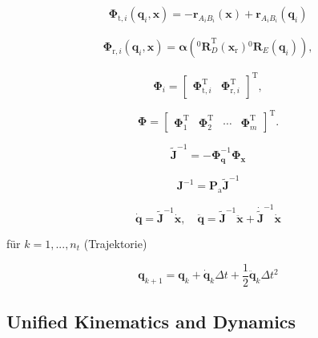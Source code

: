 \documentclass[fleqn,a4paper,10pt]{article}
\newcommand{\bm}[1]{\mathbf{#1}}
\renewcommand{\Phi}[1]{\varPhi{#1}}
\newcommand{\rotmat}[2]{{{ }^{#1}\bm{R}}_{#2}}
\newcommand{\transp}[0]{{\mathrm{T}}}
\begin{document}
\begin{multicols}{2}
%
\begin{equation}
\bm{\Phi}_{\mathrm{t},i}(\bm{q}_i,\bm{x}) = - \bm{r}_{A_iB_i}(\bm{x}) + \bm{r}_{A_iB_i}(\bm{q}_i)
\label{equ:kinconstrAB}
\end{equation}
%

\begin{align}
\bm{\Phi}_{\mathrm{r},i}(\bm{q}_i,\bm{x})
=
\bm{\alpha}\left(\rotmat{0}{D}^\transp (\bm{x}_{\mathrm{r}})\rotmat{0}{E}(\bm{q}_i)\right),
\label{equ:Phir_def_i}
\end{align}

\begin{equation}
\bm{\Phi}_i=\begin{bmatrix}
\bm{\Phi}_{\mathrm{t},i}^\transp & \bm{\Phi}_{\mathrm{r},i}^\transp
\end{bmatrix}^\transp,
\label{equ:Phi_def}
\end{equation}

\begin{equation}
\bm{\Phi}
=
\begin{bmatrix}
\bm{\Phi}_1^\transp &
\bm{\Phi}_2^\transp &
\cdots &
\bm{\Phi}_m^\transp
\end{bmatrix}^\transp.
\label{equ:constr_Phi_PKM}
\end{equation}

%

\begin{equation}
\tilde{\bm{J}}^{-1}=-\bm{\Phi}_{\bm{q}}^{-1} \bm{\Phi}_{\bm{x}}
\end{equation}

\begin{equation}
\bm{J}^{-1}=\bm{P}_{\mathrm{a}} \tilde{\bm{J}}^{-1}
\end{equation}

\begin{equation}
\dot{\bm{q}}=\tilde{\bm{J}}^{-1}\dot{\bm{x}}, \quad \ddot{\bm{q}}=\tilde{\bm{J}}^{-1}\ddot{\bm{x}}+\dot{\tilde{\bm{J}}}^{-1}\dot{\bm{x}}
\end{equation}

für $k=1,...,n_t$ (Trajektorie)

\begin{equation}
\bm{q}_{k+1}=\bm{q}_k+\dot{\bm{q}}_k \Delta t+\frac{1}{2}\ddot{\bm{q}}_k\Delta t^2
\end{equation}


\subsection{Unified Kinematics and Dynamics}


\end{multicols}
\end{document}
